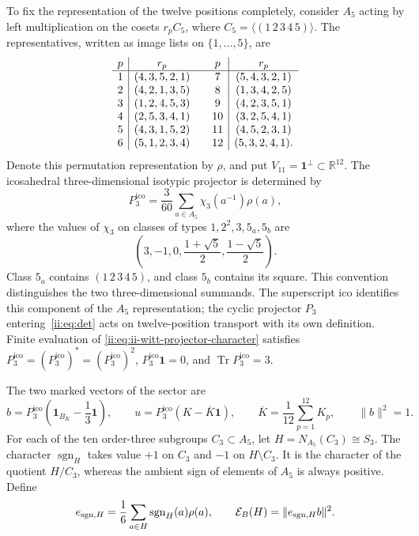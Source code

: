 To fix the representation of the twelve positions completely,
consider \(A_5\) acting by left multiplication on the
cosets \(r_pC_5\), where \(C_5=\langle(1\,2\,3\,4\,5)\rangle\).
The representatives, written as image lists on
\(\{1,\ldots,5\}\), are
\[
\begin{array}{c|c@{\qquad}c|c}
p&r_p&p&r_p\\ \hline
1&(4,3,5,2,1)&7&(5,4,3,2,1)\\
2&(4,2,1,3,5)&8&(1,3,4,2,5)\\
3&(1,2,4,5,3)&9&(4,2,3,5,1)\\
4&(2,5,3,4,1)&10&(3,2,5,4,1)\\
5&(4,3,1,5,2)&11&(4,5,2,3,1)\\
6&(5,1,2,3,4)&12&(5,3,2,4,1).
\end{array}
\]
Denote this permutation representation by \(\rho\), and put
\(V_{11}=\mathbf1^\perp\subset\mathbb R^{12}\). The icosahedral
three-dimensional isotypic projector is determined by
\begin{equation}
 P_3^{\mathrm{ico}}=\frac3{60}\sum_{a\in A_5}\chi_3(a^{-1})\rho(a),
 \label{ii:eq:ii-witt-projector-character}
\end{equation}
where the values of \(\chi_3\) on classes of types
\(1,2^2,3,5_a,5_b\) are
\[
 \left(3,-1,0,\frac{1+\sqrt5}{2},\frac{1-\sqrt5}{2}\right).
\]
Class \(5_a\) contains \((1\,2\,3\,4\,5)\), and class
\(5_b\) contains its square. This convention distinguishes the two
three-dimensional summands. The superscript \(\mathrm{ico}\) identifies
this component of the \(A_5\) representation; the cyclic projector
\(P_3\) entering~\eqref{ii:eq:det} acts on twelve-position transport
with its own definition. Finite evaluation of
\eqref{ii:eq:ii-witt-projector-character} satisfies
\(P_3^{\mathrm{ico}}=(P_3^{\mathrm{ico}})^*=(P_3^{\mathrm{ico}})^2\), \(P_3^{\mathrm{ico}}\mathbf1=0\), and
\(\operatorname{Tr}P_3^{\mathrm{ico}}=3\).

The two marked vectors of the sector are
\[
 b=P_3^{\mathrm{ico}}\left(\mathbf1_{B_K}-\frac13\mathbf1\right),
 \qquad u=P_3^{\mathrm{ico}}(K-\overline K\mathbf1),
 \qquad \overline K=\frac1{12}\sum_{p=1}^{12}K_p,
 \qquad \|b\|^2=1.
\]
For each of the ten order-three subgroups \(C_3\subset A_5\),
let \(H=N_{A_5}(C_3)\cong S_3\). The character
\(\operatorname{sgn}_H\) takes value \(+1\) on \(C_3\) and
\(-1\) on \(H\setminus C_3\). It is the character of the quotient
\(H/C_3\), whereas the ambient sign of elements of \(A_5\)
is always positive. Define
\begin{equation}
 e_{{\rm sgn},H}=\frac16\sum_{a\in H}\operatorname{sgn}_H(a)\rho(a),
 \qquad \mathcal E_B(H)=\|e_{{\rm sgn},H}b\|^2.
 \label{ii:eq:ii-witt-energy}
\end{equation}

